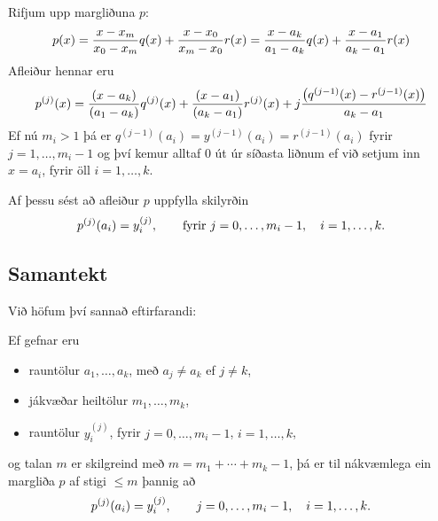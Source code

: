 \documentclass[A4paper,10pt,icelandic]{sphinxmanual}
\begin{document}
Rifjum upp margliðuna \(p\):
\begin{gather}
\begin{split}p(x) = \frac{x-x_m}{x_0-x_m}q(x)
  + \frac{x-x_0}{x_m-x_0}r(x)
  = \frac{x-a_k}{a_1-a_k}q(x)
  + \frac{x-a_1}{a_k-a_1}r(x)\end{split}\notag
\end{gather}
Afleiður hennar eru
\begin{gather}
\begin{split}p^{(j)}(x) = \frac{(x-a_k)}{(a_1-a_k)}q^{(j)}(x)
  + \frac{(x-a_1)}{(a_k-a_1)}r^{(j)}(x)
  + j \frac{\left( q^{(j-1)}(x)-r^{(j-1)}(x)\right)}{a_k-a_1}\end{split}\notag
\end{gather}
Ef nú \(m_i > 1\) þá er \(q^{(j-1)}(a_i) = y^{(j-1)}(a_i) =
r^{(j-1)}(a_i)\) fyrir \(j = 1, \ldots, m_i-1\) og því kemur alltaf
\(0\) út úr síðasta liðnum ef við setjum inn \(x = a_i\), fyrir
öll \(i = 1, \ldots, k\).

Af þessu sést að afleiður \(p\) uppfylla skilyrðin
\begin{gather}
\begin{split}p^{(j)}(a_i) = y^{(j)}_i, \qquad \text{fyrir } j=0,\ldots,m_i-1,
  \quad i=1,\ldots,k.\end{split}\notag
\end{gather}

\subsection{Samantekt}
\label{kafli03:id4}
Við höfum því sannað eftirfarandi:

Ef gefnar eru
\begin{itemize}
\item {} 
rauntölur \(a_1,\dots,a_k\), með \(a_j\neq a_k\) ef
\(j\neq k\),

\item {} 
jákvæðar heiltölur \(m_1,\dots,m_k\),

\item {} 
rauntölur \(y_i^{(j)}\), fyrir \(j=0,\dots, m_i-1\),
\(i=1,\dots,k\),

\end{itemize}

og talan \(m\) er skilgreind með \(m=m_1+\cdots+m_k-1\), þá er
til nákvæmlega ein margliða \(p\) af stigi \(\leq m\) þannig að
\begin{gather}
\begin{split}p^{(j)}(a_i)=y_i^{(j)}, \qquad j=0,\dots, m_i-1, \quad i=1,\dots,k.\end{split}\notag
\end{gather}
\end{document}
